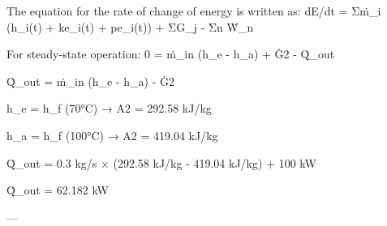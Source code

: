 The equation for the rate of change of energy is written as:  
dE/dt = Σṁ_i (h_i(t) + ke_i(t) + pe_i(t)) + ΣG_j - Σn Ẇ_n  

For steady-state operation:  
0 = ṁ_in (h_e - h_a) + Ġ2 - Q̇_out  

Q̇_out = ṁ_in (h_e - h_a) - Ġ2  

h_e = h_f (70°C) → A2  
= 292.58 kJ/kg  

h_a = h_f (100°C) → A2  
= 419.04 kJ/kg  

Q̇_out = 0.3 kg/s × (292.58 kJ/kg - 419.04 kJ/kg) + 100 kW  

Q̇_out = 62.182 kW  

---